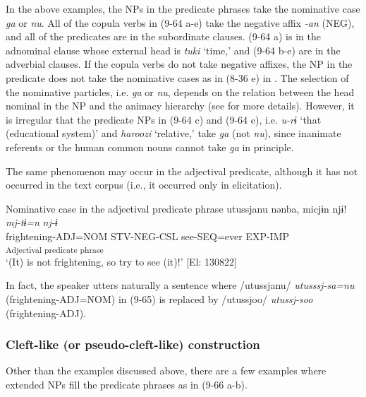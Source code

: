 In the above examples, the NPs in the predicate phrases take the nominative case \textit{ga} or \textit{nu}. All of the copula verbs in (9-64 a-e) take the negative affix \textit{{}-an} (NEG), and all of the predicates are in the subordinate clauses. (9-64 a) is in the adnominal clause whose external head is \textit{tuki} ‘time,’ and (9-64 b-e) are in the adverbial clauses. If the copula verbs do not take negative affixes, the NP in the predicate does not take the nominative cases as in (8-36 e) in . The selection of the nominative particles, i.e. \textit{ga} or \textit{nu}, depends on the relation between the head nominal in the NP and the animacy hierarchy (see  for more details). However, it is irregular that the predicate NPs in (9-64 c) and (9-64 e), i.e. \textit{u-rɨ} ‘that (educational system)’ and \textit{haroozi} ‘relative,’ take \textit{ga} (not \textit{nu}), since inanimate referents or the human common nouns cannot take \textit{ga} in principle.

  The same phenomenon may occur in the adjectival predicate, although it has not occurred in the text corpus (i.e., it occurred only in elicitation).

\ea   Nominative case in the adjectival predicate phrase \label{ex:9.65}
 \gllll  utussjanu  nənba,  micjɨn  njɨ!\\
    \textit{}  \textit{}  \textit{mj-tɨ=n}  \textit{nj-ɨ}\\
    frightening-ADJ=NOM  STV-NEG-CSL  see-SEQ=ever  EXP-IMP\\
    [Adjective  Stative verb]\textsubscript{Adjectival predicate phrase}    \\
    \glt     ‘(It) is not frightening, so try to see (it)!’ [El: 130822]
\z

In fact, the speaker utters naturally a sentence where /utussjanu/ \textit{utusssj-sa=nu} (frightening-ADJ=NOM) in (9-65) is replaced by /utussjoo/ \textit{utussj-soo} (frightening-ADJ).

\subsubsection{Cleft-like (or pseudo-cleft-like) construction}\label{sec:9.3.3.2}

Other than the examples discussed above, there are a few examples where extended NPs fill the predicate phrases as in (9-66 a-b).

